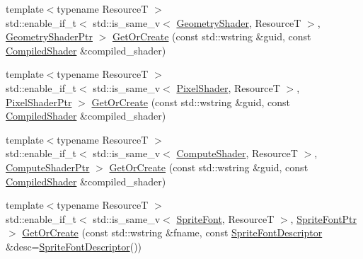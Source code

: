 \begin{DoxyCompactItemize}
\item 
{\footnotesize template$<$typename ResourceT $>$ }\\std\+::enable\+\_\+if\+\_\+t$<$ std\+::is\+\_\+same\+\_\+v$<$ \mbox{\hyperlink{namespacemage_1_1rendering_accaa3591de8a0d7a2c72c1dcc0cf9592}{Geometry\+Shader}}, ResourceT $>$, \mbox{\hyperlink{namespacemage_1_1rendering_aa5d63f80f9483d0896718813768ba1cf}{Geometry\+Shader\+Ptr}} $>$ \mbox{\hyperlink{classmage_1_1rendering_1_1_resource_manager_a42885d87fe9be9b48915961a7a0ea74a}{Get\+Or\+Create}} (const std\+::wstring \&guid, const \mbox{\hyperlink{classmage_1_1rendering_1_1_compiled_shader}{Compiled\+Shader}} \&compiled\+\_\+shader)
\item 
{\footnotesize template$<$typename ResourceT $>$ }\\std\+::enable\+\_\+if\+\_\+t$<$ std\+::is\+\_\+same\+\_\+v$<$ \mbox{\hyperlink{namespacemage_1_1rendering_a19905114913398d5073148f6c416e1b7}{Pixel\+Shader}}, ResourceT $>$, \mbox{\hyperlink{namespacemage_1_1rendering_af03d922b228ee9c8542baaa2ecc9f259}{Pixel\+Shader\+Ptr}} $>$ \mbox{\hyperlink{classmage_1_1rendering_1_1_resource_manager_a3ffd7792c3592dc6d1d0116a7e954e16}{Get\+Or\+Create}} (const std\+::wstring \&guid, const \mbox{\hyperlink{classmage_1_1rendering_1_1_compiled_shader}{Compiled\+Shader}} \&compiled\+\_\+shader)
\item 
{\footnotesize template$<$typename ResourceT $>$ }\\std\+::enable\+\_\+if\+\_\+t$<$ std\+::is\+\_\+same\+\_\+v$<$ \mbox{\hyperlink{namespacemage_1_1rendering_aa67e55ba4dca44d39b0367b31f091863}{Compute\+Shader}}, ResourceT $>$, \mbox{\hyperlink{namespacemage_1_1rendering_ab3dc9f2114f2e9255b91d9c051da52ea}{Compute\+Shader\+Ptr}} $>$ \mbox{\hyperlink{classmage_1_1rendering_1_1_resource_manager_a08621514b1cf7eada602833cddc8ab7e}{Get\+Or\+Create}} (const std\+::wstring \&guid, const \mbox{\hyperlink{classmage_1_1rendering_1_1_compiled_shader}{Compiled\+Shader}} \&compiled\+\_\+shader)
\item 
{\footnotesize template$<$typename ResourceT $>$ }\\std\+::enable\+\_\+if\+\_\+t$<$ std\+::is\+\_\+same\+\_\+v$<$ \mbox{\hyperlink{classmage_1_1rendering_1_1_sprite_font}{Sprite\+Font}}, ResourceT $>$, \mbox{\hyperlink{namespacemage_1_1rendering_ab2f34196c20422ca3692ad3f3bff3a5d}{Sprite\+Font\+Ptr}} $>$ \mbox{\hyperlink{classmage_1_1rendering_1_1_resource_manager_a77aeb15196106370b2aac04320501449}{Get\+Or\+Create}} (const std\+::wstring \&fname, const \mbox{\hyperlink{classmage_1_1rendering_1_1_sprite_font_descriptor}{Sprite\+Font\+Descriptor}} \&desc=\mbox{\hyperlink{classmage_1_1rendering_1_1_sprite_font_descriptor}{Sprite\+Font\+Descriptor}}())

\end{DoxyCompactItemize}
